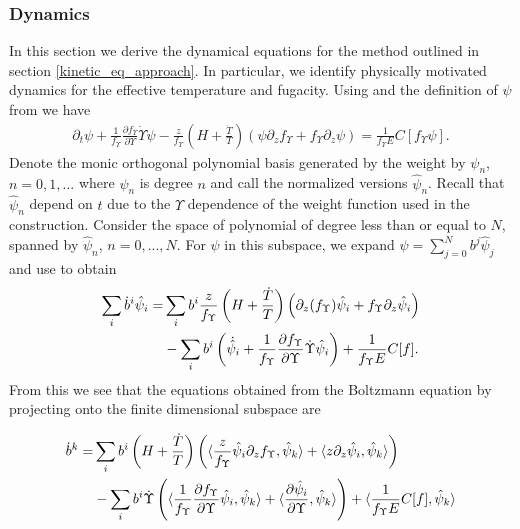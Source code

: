 
\subsubsection{Dynamics}\label{dynamics_sec}
In this section we derive the dynamical equations for the  method outlined in section \ref{kinetic_eq_approach}.  In particular, we identify physically motivated dynamics for the effective temperature and fugacity.  Using  and the definition of $\psi$ from  we have
\begin{align}\label{near_equilib_eq}
\partial_t \psi+\frac{1}{f_\Upsilon }\frac{\partial f_\Upsilon }{\partial\Upsilon}\dot\Upsilon\psi-\frac{z}{f_\Upsilon }\left(H+\frac{\dot{T}}{T}\right)\left(\psi\partial_zf_\Upsilon +f_\Upsilon \partial_z \psi\right)=\frac{1}{f_\Upsilon E}C[f_\Upsilon \psi].
\end{align}
 Denote the monic orthogonal polynomial basis generated by the weight  by $\psi_n$, $n=0,1,...$ where $\psi_n$ is degree $n$ and call the normalized versions  $\hat{\psi}_n$. Recall that $\hat\psi_n$ depend on $t$ due to the $\Upsilon$ dependence of the weight function used in the construction. Consider the space of polynomial of degree less than or equal to $N$, spanned by $\hat\psi_n$, $n=0,...,N$.   For $\psi$ in this subspace, we expand $\psi=\sum_{j=0}^Nb^j\hat\psi_j$ and use   to obtain
\begin{align}\label{T_vars}
\sum_i \dot{b}^i\hat\psi_i=&\sum_ib^i\frac{z}{f_\Upsilon }\left(H+\frac{\dot{T}}{T}\right)\left(\partial_z(f_\Upsilon )\hat\psi_i+f_\Upsilon \partial_z\hat\psi_i\right)\\
&-\sum_ib^i\left(\dot{\hat{\psi}}_i+\frac{1}{f_\Upsilon }\frac{\partial f_\Upsilon }{\partial\Upsilon}\dot\Upsilon\hat\psi_i\right)+\frac{1}{f_\Upsilon E}C[f].
\notag
\end{align}
From this we see  that the equations obtained from the Boltzmann equation by projecting onto the finite dimensional subspace are

\begin{align}
\dot b^k=& \sum_i b^i\left(H+\frac{\dot{T}}{T}\right)\left(\langle\frac{z}{f_\Upsilon }\hat\psi_i\partial_zf_\Upsilon ,\hat\psi_k\rangle+\langle z\partial_z \hat\psi_i,\hat\psi_k\rangle\right) \\
&-\sum_i b^i\dot{\Upsilon}\left(\langle\frac{1}{f_\Upsilon }\frac{\partial f_\Upsilon }{\partial\Upsilon}\hat\psi_i,\hat\psi_k\rangle+\langle\frac{\partial\hat{\psi}_i}{\partial \Upsilon},\hat\psi_k\rangle\right)+\langle\frac{1}{f_\Upsilon E}C[f],\hat\psi_k\rangle\notag
\end{align}


